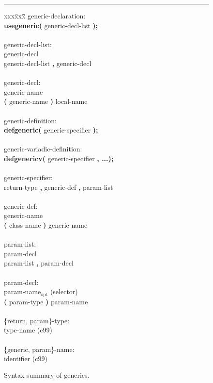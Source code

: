 \documentclass[preprint,10pt]{sigplanconf}
\newcommand{\ttb}[1]{{\normalfont\ttfamily\bfseries #1}}
\newcommand{\opt}{\ensuremath{_{\text{opt}}}\xspace}
\newcommand{\hr}{\rule{\columnwidth}{0.33pt}}
\begin{document}
\begin{figure}\hr
\begin{center}
{\em\vspace{-1mm}
\begin{tabbing}
xxx\= xxx\= \hspace*{17.5em}\= \hspace*{1.5em}\= \kill
generic-declaration: \\
\> \ttb{usegeneric(} generic-decl-list \ttb{);} \\
\\
generic-decl-list: \\
\> generic-decl \\
\> generic-decl-list \ttb{,} generic-decl \\
\\
generic-decl: \\
\> generic-name \\
\> \ttb{(} generic-name \ttb{)} local-name \\
\\
generic-definition: \\
\> \ttb{defgeneric(} generic-specifier \ttb{);} \\
\\
generic-variadic-definition: \\
\> \ttb{defgenericv(} generic-specifier \ttb{, ...);} \\
\\
generic-specifier: \\
\> return-type \ttb{,} generic-def \ttb{,} param-list \\
\\
generic-def: \\
\> generic-name \\
\> \ttb{(} class-name \ttb{)} generic-name \\
\\
param-list: \\
\> param-decl \\
\> param-list \ttb{,} param-decl \\
\\
param-decl: \\
\> param-name\opt 					\>\> (selector) \\
\> \ttb{(} param-type \ttb{)} param-name \\
\\
\{return, param\}-type: \\
\> type-name							\>\>\> (c99) \\
\\
\{generic, param\}-name: \\
\> identifier						\>\>\> (c99)
\end{tabbing}
\vspace{-1mm}}
\end{center}
\caption{Syntax summary of generics.\label{fig:gengram}}
\end{figure}
\end{document}
